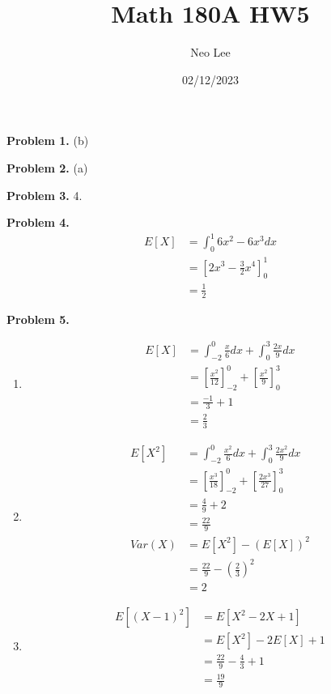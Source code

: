 \documentclass{article}
\title{Math 180A HW5}
\author{Neo Lee}
\date{02/12/2023}
\begin{document}
 

\maketitle 

\textbf{Problem 1.} (b)
\bigbreak

\textbf{Problem 2.} (a)
\bigbreak

\textbf{Problem 3.} 4.
\bigbreak

\textbf{Problem 4.} 
\begin{align}
    E[X] & = \int_{0}^{1}6x^2-6x^3dx \\
    & = \left[2x^3 - \frac{3}{2}x^4\right]_0^1 \\ 
    & = \frac{1}{2}
\end{align}
\bigbreak

\textbf{Problem 5.}
\begin{enumerate}[label={(\alph*)}]
    \item 
    \begin{align}
        E[X] & = \int_{-2}^{0}\frac{x}{6}dx + \int_{0}^{3} \frac{2x}{9}dx \\
        & = \left[\frac{x^2}{12}\right]_{-2}^0 + \left[\frac{x^2}{9}\right]_0^3 \\
        & = \frac{-1}{3} + 1 \\
        & = \frac{2}{3}
    \end{align}

    \item 
    \begin{align}
        E[X^2] & = \int_{-2}^{0}\frac{x^2}{6}dx + \int_{0}^{3}\frac{2x^2}{9}dx \\
        & = \left[\frac{x^3}{18}\right]_{-2}^0 + \left[\frac{2x^3}{27}\right]_0^3 \\
        & = \frac{4}{9} + 2 \\
        & = \frac{22}{9} \\
        Var(X) & = E[X^2] - (E[X])^2 \\
        & = \frac{22}{9} - \left(\frac{2}{3}\right)^2 \\
        & = 2
    \end{align}

    \item 
    \begin{align}
        E[(X-1)^2] & = E[X^2-2X+1] \\
        & = E[X^2]-2E[X]+1 \\
        & = \frac{22}{9} - \frac{4}{3}+1 \\
        & = \frac{19}{9}
    \end{align}
\end{enumerate}
\bigbreak
\end{document}
